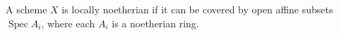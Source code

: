 A scheme $X$ is locally noetherian if it can be covered by open affine subsets $\operatorname{Spec} A_i$, where each $A_i$ is a noetherian ring.
